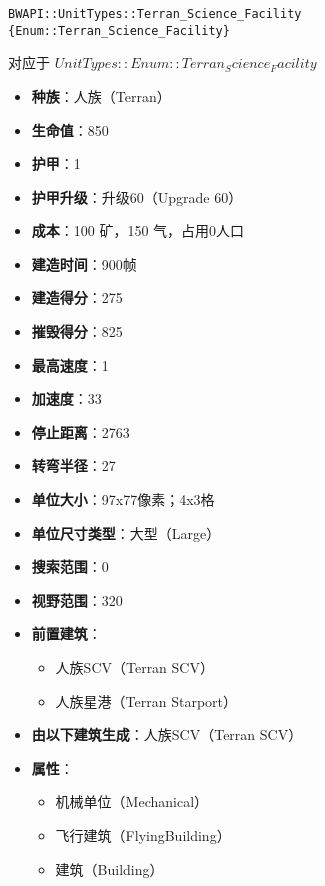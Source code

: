 \begin{tcolorbox}[colback=white, colframe=black!60!white, title=Terran\_Science\_Facility(), arc=0mm]
    \begin{verbatim}
BWAPI::UnitTypes::Terran_Science_Facility {Enum::Terran_Science_Facility}
    \end{verbatim}
    对应于  $ UnitTypes::Enum::Terran_Science_Facility $ 
    \begin{itemize}
        \item \textbf{种族}：人族（Terran）
        \item \textbf{生命值}：850
        \item \textbf{护甲}：1
        \item \textbf{护甲升级}：升级60（Upgrade 60）
        \item \textbf{成本}：100 矿，150 气，占用0人口
        \item \textbf{建造时间}：900帧
        \item \textbf{建造得分}：275
        \item \textbf{摧毁得分}：825
        \item \textbf{最高速度}：1
        \item \textbf{加速度}：33
        \item \textbf{停止距离}：2763
        \item \textbf{转弯半径}：27
        \item \textbf{单位大小}：97x77像素；4x3格
        \item \textbf{单位尺寸类型}：大型（Large）
        \item \textbf{搜索范围}：0
        \item \textbf{视野范围}：320
        \item \textbf{前置建筑}：
            \begin{itemize}
                \item 人族SCV（Terran SCV）
                \item 人族星港（Terran Starport）
            \end{itemize}
        \item \textbf{由以下建筑生成}：人族SCV（Terran SCV）
        \item \textbf{属性}：
            \begin{itemize}
                \item 机械单位（Mechanical）
                \item 飞行建筑（FlyingBuilding）
                \item 建筑（Building）
            \end{itemize}
    \end{itemize} 
\end{tcolorbox}

